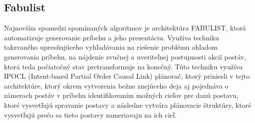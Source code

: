 \subsection{Fabulist}
Najnovším spomedzi spomínaných algoritmov je architektúra FABULIST\cite{fabulist}, ktorá automatizuje generovanie príbehu a jeho prezentáciu. Využíva techniku takzvaného upresňujúceho vyhľadávania na riešenie problému ohľadom generovania príbehu, na nájdenie zvučnej a uveriteľnej postupnosti akcií postáv, ktorá teda počiatočný stav pretransformuje na konečný. Túto techniku využíva IPOCL (Intent-based Partial Order Causal Link) plánovač, ktorý priniesli v tejto architektúre, ktorý okrem vytvorenia bežne znejúceho deja aj pojednáva o zámeroch postáv v príbehu identifikovaním možných cieľov pre danú postavu, ktoré vysvetľujú spravanie postavy a následne vytvára plánovacie štruktúry, ktoré vysvetľujú prečo sa tieto postavy zameriavaju na ich cieľ.
